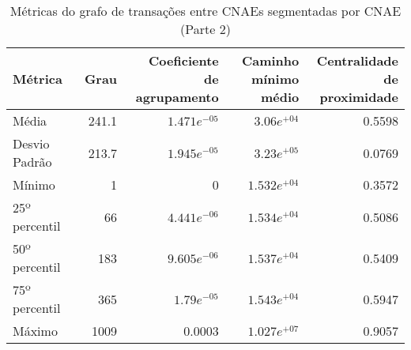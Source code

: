 \begin{table}[htb]
\centering
\caption{Métricas do grafo de transações entre CNAEs segmentadas por CNAE (Parte 2)}
\label{tab:metricas-redes:grafo-por-cnae-especificas2}
\begin{tabular}{l|rrrr}
\toprule
Métrica & Grau &  \shortstack{Coeficiente\\de agrupamento} &  \shortstack{Caminho\\mínimo médio} &  \shortstack{Centralidade\\de proximidade} \\
\midrule
Média         &   241.1 &   $1.471e^{-05}$ &  $3.06e^{+04}$  & 0.5598 \\
Desvio Padrão &   213.7 &   $1.945e^{-05}$ &  $3.23e^{+05}$  & 0.0769 \\
Mínimo        &       1 &                0 & $1.532e^{+04}$ & 0.3572 \\
25º percentil &      66 &   $4.441e^{-06}$ & $1.534e^{+04}$ & 0.5086 \\
50º percentil &     183 &   $9.605e^{-06}$ & $1.537e^{+04}$ & 0.5409 \\
75º percentil &     365 &    $1.79e^{-05}$ & $1.543e^{+04}$ & 0.5947 \\
Máximo        &    1009 &           0.0003 & $1.027e^{+07}$ & 0.9057 \\
\bottomrule
\end{tabular}
\fdadospesquisa
\end{table}
